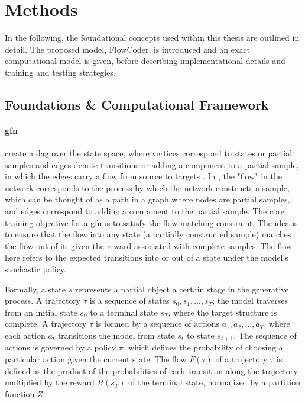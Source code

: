 \section{Methods}
In the following, the foundational concepts used within this thesis are outlined in detail. The proposed model, FlowCoder, is introduced and an exact computational model is given, before describing implementational details and training and testing strategies.
\subsection{Foundations \& Computational Framework}

\paragraph*{\acrshort{gfn}}  create a \acrfull{dag} over the state space, where vertices correspond to states or partial samples and edges denote transitions or adding a component to a partial sample, in which the edges carry a flow from source to targets \cite{bengioFlowNetworkBased2021}.
In , the "flow" in the network corresponds to the process by which the network constructs a sample, which can be thought of as a path in a graph where nodes are partial samples, and edges correspond to adding a component to the partial sample.
The core training objective for a \acrshort{gfn} is to satisfy the flow matching constraint. The idea is to ensure that the flow into any state (a partially constructed sample) matches the flow out of it, given the reward associated with complete samples. The flow here refers to the expected transitions into or out of a state under the model's stochastic policy. 

Formally, a state \( s \) represents a partial object a certain stage in the generative process. A trajectory \( \tau \) is a sequence of states \( s_0, s_1, ..., s_T \); the model traverses from an initial state \( s_0 \) to a terminal state \( s_T \), where the target structure is complete.
A trajectory \( \tau \) is formed by a sequence of actions \( a_1, a_2, ..., a_T \), where each action \( a_t \) transitions the model from state \( s_{t} \) to state \( s_{t+1} \). The sequence of actions is governed by a policy \( \pi \), which defines the probability of choosing a particular action given the current state.
The flow \( F(\tau) \) of a trajectory \( \tau \) is defined as the product of the probabilities of each transition along the trajectory, multiplied by the reward \( R(s_T) \) of the terminal state, normalized by a partition function \( Z \).

